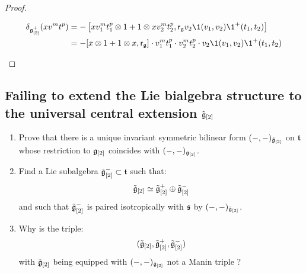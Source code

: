 \begin{proof}
\begin{enumerate}
                        $$
                            \begin{aligned}
                                \delta_{\g_{[2]}^+}( x v^m t^p ) & = -\left[x v_1^m t_1^p \tensor 1 + 1 \tensor x v_2^m t_2^p, \sfr_{\g} v_2 \1(v_1, v_2) \1^+(t_1, t_2)\right]
                                \\
                                & = -[x \tensor 1 + 1 \tensor x, \sfr_{\g}] \cdot v_1^m t_1^p \cdot v_2^m t_2^p \cdot v_2 \1(v_1, v_2) \1^+(t_1, t_2)
                            \end{aligned}
                        $$
                \end{enumerate}
            \end{proof}

    \subsection{Failing to extend the Lie bialgebra structure to the universal central extension \texorpdfstring{$\tilde{\mathfrak{g}}_{[2]}$}{}}
        \begin{question} \label{question: extending_invariant_inner_products_on_multi_loop_to_universal_central_extensions}
            \begin{enumerate}
                \item Prove that there is a unique invariant symmetric bilinear form $(-, -)_{\tilde{\mathfrak{g}}_{[2]}}$ on $\mathfrak{t}$ whose restriction to $\mathfrak{g}_{[2]}$ coincides with $(-, -)_{\mathfrak{g}_{[2]}}$.
                \item Find a Lie subalgebra $\tilde{\mathfrak{g}}_{[2]}^- \subset \mathfrak{t}$ such that:
                    $$\tilde{\mathfrak{g}}_{[2]}\simeq \tilde{\mathfrak{g}}_{[2]}^+\oplus \tilde{\mathfrak{g}}_{[2]}^-$$
                and such that $\tilde{\mathfrak{g}}_{[2]}^-$ is paired isotropically with $\mathfrak{s}$ by $(-, -)_{\tilde{\mathfrak{g}}_{[2]}}$. 
                \item Why is the triple:
                    $$(\tilde{\mathfrak{g}}_{[2]}, \tilde{\mathfrak{g}}_{[2]}^+, \tilde{\mathfrak{g}}_{[2]}^-)$$
                with $\tilde{\mathfrak{g}}_{[2]}$ being equipped with $(-, -)_{\tilde{\mathfrak{g}}_{[2]}}$ not a Manin triple ?
            \end{enumerate}
        \end{question}
